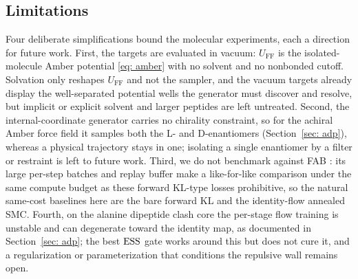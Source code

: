 \documentclass{article}
\begin{document}
\subsection{Limitations}
\label{sec: mol-limitations}

Four deliberate simplifications bound the molecular experiments, each a direction for future work. First, the
targets are evaluated in vacuum: $U_{\mathrm{FF}}$ is the isolated-molecule Amber potential \eqref{eq: amber} with no solvent
and no nonbonded cutoff. Solvation only reshapes $U_{\mathrm{FF}}$ and not the sampler, and the vacuum targets already
display the well-separated potential wells the generator must discover and resolve, but implicit or explicit
solvent and larger peptides are left untreated. Second, the internal-coordinate generator carries no chirality
constraint, so for the achiral Amber force field it samples both the L- and D-enantiomers
(Section~\ref{sec: adp}), whereas a physical trajectory stays in one; isolating a single enantiomer by a filter
or restraint is left to future work. Third, we do not benchmark against FAB
\citep{midgley2022flow}: its large per-step batches and replay buffer make a like-for-like comparison under the
same compute budget as these forward KL-type losses prohibitive, so the natural same-cost baselines here are
the bare forward KL and the identity-flow annealed SMC. Fourth, on the alanine dipeptide clash core the
per-stage flow training is unstable and can degenerate toward the identity map, as documented in
Section~\ref{sec: adp}; the best $\mathrm{ESS}$ gate works around this but does not cure it, and a regularization or
parameterization that conditions the repulsive wall remains open.





\end{document}
